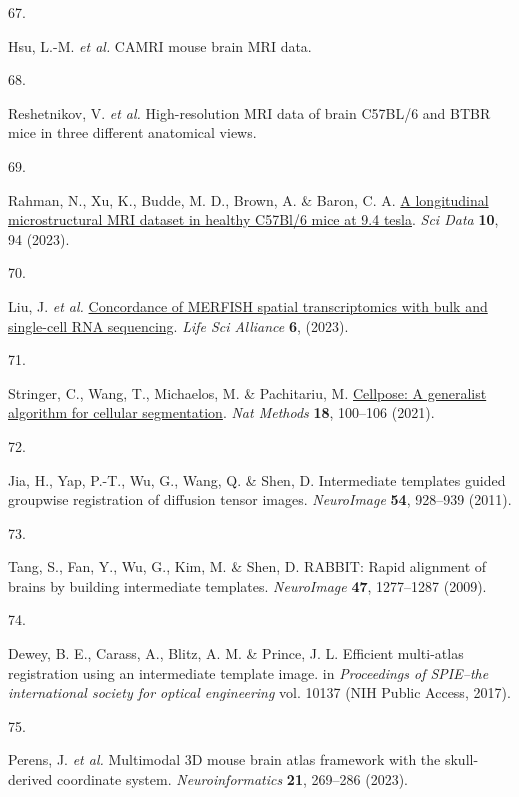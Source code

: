 \documentclass[
  12pt,
]{article}
\newlength{\cslhangindent}
\newlength{\csllabelwidth}
\newenvironment{CSLReferences}[2] %
 {\begin{list}{}{%
  \setlength{\itemindent}{0pt}
  \setlength{\leftmargin}{0pt}
  \setlength{\parsep}{0pt}
  \ifodd #1
   \setlength{\leftmargin}{\cslhangindent}
   \setlength{\itemindent}{-1\cslhangindent}
  \fi
  \setlength{\itemsep}{#2\baselineskip}}}
 {\end{list}}
\newcommand{\CSLLeftMargin}[1]{\parbox[t]{\csllabelwidth}{\strut#1\strut}}
\newcommand{\CSLRightInline}[1]{\parbox[t]{\linewidth - \csllabelwidth}{\strut#1\strut}}
\begin{document}
\begin{CSLReferences}{0}{0}
\CSLLeftMargin{67. }%
\CSLRightInline{Hsu, L.-M. \emph{et al.} CAMRI mouse brain MRI data.}

\CSLLeftMargin{68. }%
\CSLRightInline{Reshetnikov, V. \emph{et al.} High-resolution MRI data
of brain C57BL/6 and BTBR mice in three different anatomical views.}

\CSLLeftMargin{69. }%
\CSLRightInline{Rahman, N., Xu, K., Budde, M. D., Brown, A. \& Baron, C.
A. \href{https://doi.org/10.1038/s41597-023-01942-5}{A longitudinal
microstructural MRI dataset in healthy C57Bl/6 mice at 9.4 tesla}.
\emph{Sci Data} \textbf{10}, 94 (2023).}

\CSLLeftMargin{70. }%
\CSLRightInline{Liu, J. \emph{et al.}
\href{https://doi.org/10.26508/lsa.202201701}{Concordance of MERFISH
spatial transcriptomics with bulk and single-cell RNA sequencing}.
\emph{Life Sci Alliance} \textbf{6}, (2023).}

\CSLLeftMargin{71. }%
\CSLRightInline{Stringer, C., Wang, T., Michaelos, M. \& Pachitariu, M.
\href{https://doi.org/10.1038/s41592-020-01018-x}{Cellpose: A generalist
algorithm for cellular segmentation}. \emph{Nat Methods} \textbf{18},
100--106 (2021).}

\CSLLeftMargin{72. }%
\CSLRightInline{Jia, H., Yap, P.-T., Wu, G., Wang, Q. \& Shen, D.
Intermediate templates guided groupwise registration of diffusion tensor
images. \emph{NeuroImage} \textbf{54}, 928--939 (2011).}

\CSLLeftMargin{73. }%
\CSLRightInline{Tang, S., Fan, Y., Wu, G., Kim, M. \& Shen, D. RABBIT:
Rapid alignment of brains by building intermediate templates.
\emph{NeuroImage} \textbf{47}, 1277--1287 (2009).}

\CSLLeftMargin{74. }%
\CSLRightInline{Dewey, B. E., Carass, A., Blitz, A. M. \& Prince, J. L.
Efficient multi-atlas registration using an intermediate template image.
in \emph{Proceedings of SPIE--the international society for optical
engineering} vol. 10137 (NIH Public Access, 2017).}

\CSLLeftMargin{75. }%
\CSLRightInline{Perens, J. \emph{et al.} Multimodal 3D mouse brain atlas
framework with the skull-derived coordinate system.
\emph{Neuroinformatics} \textbf{21}, 269--286 (2023).}


\end{CSLReferences}
\end{document}
